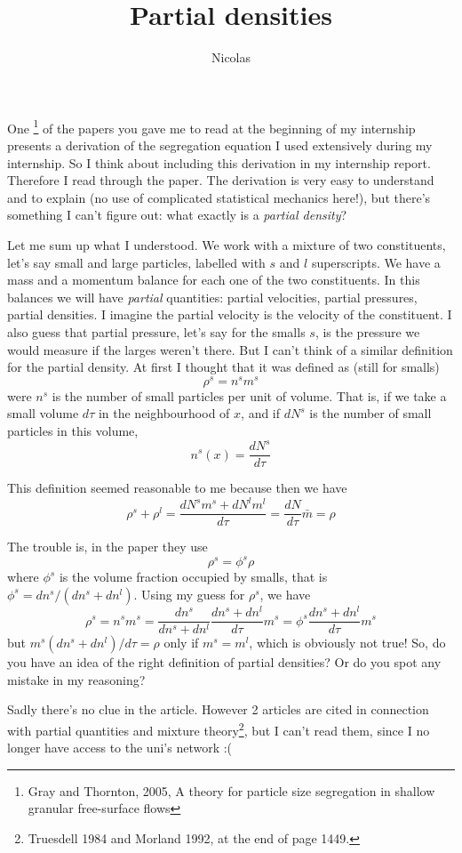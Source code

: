 \documentclass[11pt]{article}
\title{\textbf{Partial densities}}
\author{Nicolas}
\date{}
\begin{document}
\maketitle

One \footnote{Gray and Thornton, 2005, A theory for particle size segregation in shallow granular free-surface flows} of the papers you gave me to read at the beginning of my internship presents a derivation of the segregation equation I used extensively during my internship. 
So I think about including this derivation in my internship report. 
Therefore I read through the paper. The derivation is very easy to understand and to explain (no use of complicated statistical mechanics here!), but there's something I can't figure out: what exactly is a \textit{partial density}?

Let me sum up what I understood. We work with a mixture of two constituents, let's say small and large particles, labelled with $s$ and $l$ superscripts.
We have a mass and a momentum balance for each one of the two constituents. 
In this balances we will have \textit{partial} quantities: partial velocities, partial pressures, partial densities. 
I imagine the partial velocity is the velocity of the constituent. I also guess that partial pressure, let's say for the smalls $s$, is the pressure we would measure if the larges weren't there. 
But I can't think of a similar definition for the partial density. 
At first I thought that it was defined as (still for smalls)
\[
\rho^s = n^s m^s
\]
were $n^s$ is the number of small particles per unit of volume. That is, if we take a small volume $d\tau$ in the neighbourhood of $x$, and if $dN^s$ is the number of small particles in this volume,
\[
n^s(x) = \frac{dN^s}{d\tau}
\]

This definition seemed reasonable to me because then we have
\[
\rho^s + \rho^l = \frac{ dN^s m^s + dN^l m^l }{d\tau} 
= \frac{dN}{d\tau}\bar{m} = \rho
\]

The trouble is, in the paper they use
\[
\rho^s = \phi^s \rho
\]
where $\phi^s$ is the volume fraction occupied by smalls, that is $\phi^s = dn^s/(dn^s + dn^l)$.
Using my guess for $\rho^s$, we have
\[
\rho^s = n^s m^s = \frac{dn^s}{dn^s + dn^l} \frac{dn^s + dn^l}{d\tau} m^s = \phi^s \frac{dn^s + dn^l}{d\tau} m^s
\]
but $m^s (dn^s + dn^l)/d\tau = \rho$ only if $m^s = m^l$, which is obviously not true!
So, do you have an idea of the right definition of partial densities? Or do you spot any mistake in my reasoning?

Sadly there's no clue in the article. However 2 articles are cited in connection with partial quantities and mixture theory\footnote{Truesdell 1984 and Morland 1992, at the end of page 1449.}, but I can't read them, since I no longer have access to the uni's network :( 
\end{document}

